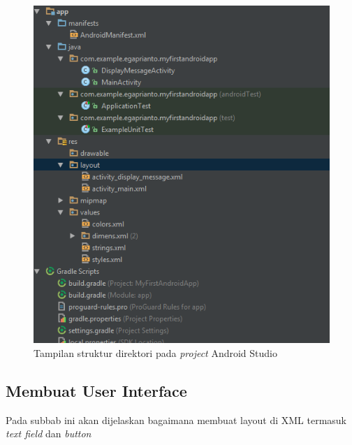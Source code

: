 \begin{figure}[htbp]
	\centering
		\includegraphics[scale=1]{Gambar/android-studio-structure.png}
	\caption{Tampilan struktur direktori pada \textit{project} Android Studio}
	\label{fig:android-studio-structure}
\end{figure}

\subsection{Membuat User Interface}
Pada subbab ini akan dijelaskan bagaimana membuat layout di XML termasuk \textit{text field} dan \textit{button}
